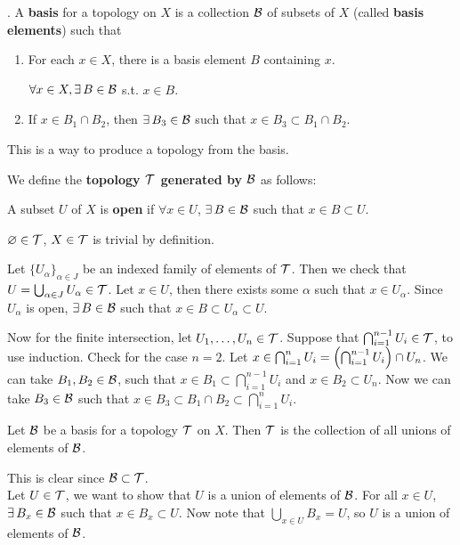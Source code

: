 .  A \textbf{basis} for a topology on \(X\) is a collection \(\mathcal{B}\) of subsets of \(X\) (called \textbf{basis elements}) such that
\begin{enumerate}
    \item For each \(x \in X\), there is a basis element \(B\) containing \(x\).
          \begin{center}
              \(\forall x \in X, \exists B \in \mc{B}\) s.t. \(x \in B\).
          \end{center}
    \item If \(x \in B_1 \cap B_2\), then \(\exists B_3 \in \mc{B}\) such that \(x \in B_3 \subset B_1 \cap B_2\).
\end{enumerate}

This is a way to produce a topology from the basis.

\rmk We define the \textbf{topology \(\mathcal{T}\) generated by \(\mathcal{B}\)} as follows:
\begin{center}
    A subset \(U\) of \(X\) is \textbf{open} if \(\forall x \in U\), \(\exists B\in \mc{B}\) such that \(x \in B \subset U\).
\end{center}

\pf \(\varnothing \in \mathcal{T}\), \(X \in \mathcal{T}\) is trivial by definition.

Let \(\{U_\alpha\}_{\alpha \in J}\) be an indexed family of elements of \(\mathcal{T}\). Then we check that \(U = \bigcup_{\alpha \in J} U_\alpha \in \mathcal{T}\). Let \(x \in U\), then there exists some \(\alpha\) such that \(x \in U_\alpha\). Since \(U_\alpha\) is open, \(\exists B \in \mc{B}\) such that \(x \in B \subset U_\alpha \subset U\).

Now for the finite intersection, let \(U_1, \dots, U_n \in \mathcal{T}\). Suppose that \(\bigcap_{i=1}^{n - 1} U_i \in \mathcal{T}\), to use induction. Check for the case \(n = 2\). Let \(x \in \bigcap_{i=1}^n U_i = \left( \bigcap_{i=1}^{n - 1} U_i \right) \cap U_n\). We can take \(B_1, B_2 \in \mathcal{B}\), such that \(x \in B_1 \subset \bigcap_{i=1}^{n - 1} U_i\) and \(x \in B_2 \subset U_n\). Now we can take \(B_3 \in \mathcal{B}\) such that \(x \in B_3 \subset B_1 \cap B_2 \subset \bigcap_{i=1}^{n} U_i\).

 Let \(\mathcal{B}\) be a basis for a topology \(\mathcal{T}\) on \(X\). Then \(\mathcal{T}\) is the collection of all unions of elements of \(\mathcal{B}\).

\pf \note{\(\supset\)} This is clear since \(\mathcal{B} \subset \mathcal{T}\). \\
\note{\(\subset\)} Let \(U \in \mathcal{T}\), we want to show that \(U\) is a union of elements of \(\mathcal{B}\). For all \(x \in U\), \(\exists B_x \in \mc{B}\) such that \(x \in B_x \subset U\). Now note that \(\bigcup_{x \in U} B_x = U\), so \(U\) is a union of elements of \(\mathcal{B}\).


\pagebreak
